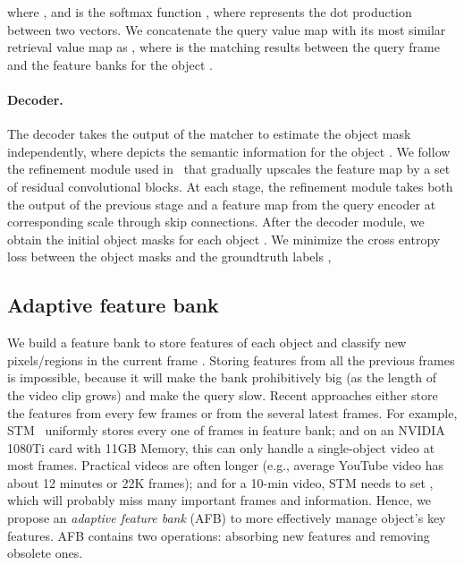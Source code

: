 \documentclass{article}
\begin{document}
where , and  is the softmax function , where  represents the dot production between two vectors.
We concatenate the query value map with its most similar retrieval value map as , where  is the matching results between the query frame and the feature banks for the object .

\paragraph{Decoder.}
The decoder takes the output of the matcher  to estimate the object mask independently, where  depicts the semantic information for the object .
We follow the refinement module used in~\cite{oh_fast_2018, lin_agss-vos_2019, oh_video_2019} that gradually upscales the feature map by a set of residual convolutional blocks.
At each stage, the refinement module takes both the output of the previous stage and a feature map from the query encoder at corresponding scale through skip connections.
After the decoder module, we obtain the initial object masks  for each object .
We minimize the cross entropy loss  between the object masks and the groundtruth labels ,


\subsection{Adaptive feature bank}
\label{sec:featurebank}

We build a feature bank to store features of each object and classify new pixels/regions in the current frame . 
Storing features from all the previous frames  is impossible, because it will make the bank prohibitively big (as the length of the video clip grows) and make the query slow. 
Recent approaches either store the features from every few frames or from the several latest frames.
For example, STM~\cite{oh_video_2019} uniformly stores every one of  frames in feature bank; and on an NVIDIA 1080Ti card with 11GB Memory, this can only handle a single-object video at most  frames. 
Practical videos are often longer (e.g., average YouTube video has about 12 minutes or 22K frames); and for a 10-min video, STM needs to set , which will probably miss many important frames and information. 
Hence, we propose an \emph{adaptive feature bank} (AFB) to more effectively manage object’s key features.
AFB contains two operations: absorbing new features and removing obsolete ones.
\end{document}
